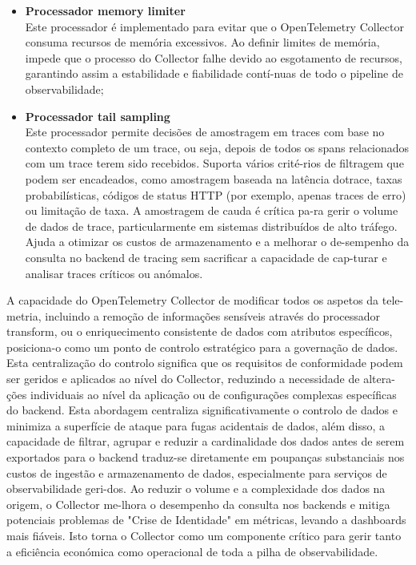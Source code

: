 \begin{itemize}
    \item \textbf{Processador memory limiter} \\
    Este processador é implementado para evitar que o OpenTelemetry Collector consuma recursos de memória excessivos. Ao definir limites de memória, impede que o processo do Collector falhe devido ao esgotamento de recursos, garantindo assim a estabilidade e fiabilidade contí-nuas de todo o pipeline de observabilidade;
    
    \item \textbf{Processador tail sampling} \\ Este processador permite decisões de amostragem em traces com base no contexto completo de um trace, ou seja, depois de todos os spans relacionados com um trace terem sido recebidos. Suporta vários crité-rios de filtragem que podem ser encadeados, como amostragem baseada na latência dotrace, taxas probabilísticas, códigos de status HTTP (por exemplo, apenas traces de erro) ou limitação de taxa. A amostragem de cauda é crítica pa-ra gerir o volume de dados de trace, particularmente em sistemas distribuídos de alto tráfego. Ajuda a otimizar os custos de armazenamento e a melhorar o de-sempenho da consulta no backend de tracing sem sacrificar a capacidade de cap-turar e analisar traces críticos ou anómalos.
\end{itemize}


A capacidade do OpenTelemetry Collector de modificar todos os aspetos da tele-metria, incluindo a remoção de informações sensíveis através do processador transform, ou o enriquecimento consistente de dados com atributos específicos, posiciona-o como um ponto de controlo estratégico para a governação de dados. Esta centralização do controlo significa que os requisitos de conformidade podem ser geridos e aplicados ao nível do Collector, reduzindo a necessidade de altera-ções individuais ao nível da aplicação ou de configurações complexas específicas do backend. 
Esta abordagem centraliza significativamente o controlo de dados e minimiza a superfície de ataque para fugas acidentais de dados, além disso, a capacidade de filtrar, agrupar e reduzir a cardinalidade dos dados antes de serem exportados para o backend traduz-se diretamente em poupanças substanciais nos custos de ingestão e armazenamento de dados, especialmente para serviços de observabilidade geri-dos. Ao reduzir o volume e a complexidade dos dados na origem, o Collector me-lhora o desempenho da consulta nos backends e mitiga potenciais problemas de "Crise de Identidade" em métricas, levando a dashboards mais fiáveis. Isto torna o Collector como um componente crítico para gerir tanto a eficiência económica como operacional de toda a pilha de observabilidade.


